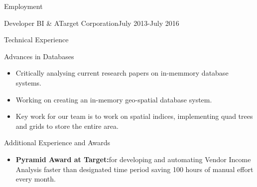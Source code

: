 \documentclass[]{nakulcv}
\begin{document}
\begin{cvsection}{Employment}
\begin{cvsubsection}{Developer BI \& A}{Target Corporation}{July 2013-July 2016}
\begin{cvsection}{Technical Experience}
		\begin{cvsubsection}{Advances in Databases}{}{}
			\begin{itemize}
				\item Critically analysing current research papers on in-memmory database systems.
				\item Working on creating an in-memory geo-spatial database system.
				\item Key work for our team is to work on spatial indices, implementing quad trees and grids to store the entire area.
			\end{itemize}
		\end{cvsubsection}
	\end{cvsection}
	\begin{cvsection}{Additional Experience and Awards}
		\begin{cvsubsection}{}{}{}	
			\begin{itemize}
				\item \textbf{Pyramid Award at Target:}for developing and automating Vendor Income Analysis faster than designated time period saving 100 hours of manual effort every month.

\end{itemize}
\end{cvsubsection}
\end{cvsection}
\end{cvsubsection}
\end{cvsection}
\end{document}
